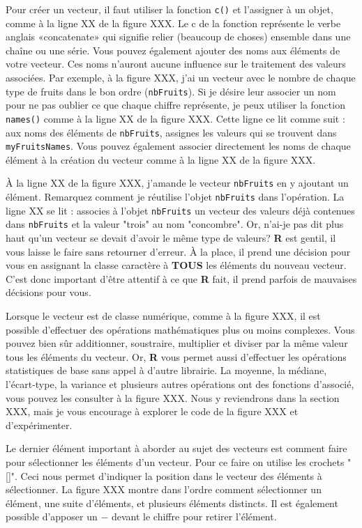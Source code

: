 \documentclass[10.5pt,a4paper]{article}
\begin{document}
    Pour créer un vecteur, il faut utiliser la fonction \texttt{c()} et l'assigner à un objet, comme à la ligne XX de la figure XXX. Le c de la fonction représente le verbe anglais «concatenate» qui signifie relier (beaucoup de choses) ensemble dans une chaîne ou une série. Vous pouvez également ajouter des noms aux éléments de votre vecteur. Ces noms n'auront aucune influence sur le traitement des valeurs associées. Par exemple, à la figure XXX, j'ai un vecteur avec le nombre de chaque type de fruits dans le bon ordre (\texttt{nbFruits}). Si je désire leur associer un nom pour ne pas oublier ce que chaque chiffre représente, je peux utiliser la fonction \texttt{names()} comme à la ligne XX de la figure XXX. Cette ligne ce lit comme suit : aux noms des éléments de \texttt{nbFruits}, assignes les valeurs qui se trouvent dans \texttt{myFruitsNames}. Vous pouvez également associer directement les noms de chaque élément à la création du vecteur comme à la ligne XX de la figure XXX. 
    
    À la ligne XX de la figure XXX, j'amande le vecteur \texttt{nbFruits} en y ajoutant un élément. Remarquez comment je réutilise l'objet \texttt{nbFruits} dans l'opération. La ligne XX se lit : associes à l'objet \texttt{nbFruits} un vecteur des valeurs déjà contenues dans \texttt{nbFruits} et la valeur "trois" au nom "concombre". Or, n'ai-je pas dit plus haut qu'un vecteur se devait d'avoir le même type de valeurs? \textbf{R} est gentil, il vous laisse le faire sans retourner d'erreur. À la place, il prend une décision pour vous en assignant la classe caractère à \textbf{TOUS} les éléments du nouveau vecteur. C'est donc important d'être attentif à ce que \textbf{R} fait, il prend parfois de mauvaises décisions pour vous. 
    
    Lorsque le vecteur est de classe numérique, comme à la figure XXX, il est possible d'effectuer des opérations mathématiques plus ou moins complexes. Vous pouvez bien sûr additionner, soustraire, multiplier et diviser par la même valeur tous les éléments du vecteur. Or, \textbf{R} vous permet aussi d'effectuer les opérations statistiques de base sans appel à d'autre librairie. La moyenne, la médiane, l'écart-type, la variance et plusieurs autres opérations ont des fonctions d'associé, vous pouvez les consulter à la figure XXX. Nous y reviendrons dans la section XXX, mais je vous encourage à explorer le code de la figure XXX et d'expérimenter. 
    
    Le dernier élément important à aborder au sujet des vecteurs est comment faire pour sélectionner les éléments d'un vecteur. Pour ce faire on utilise les crochets "[]". Ceci nous permet d'indiquer la position dans le vecteur des éléments à sélectionner. La figure XXX montre dans l'ordre comment sélectionner un élément, une suite d'éléments, et plusieurs éléments distincts. Il est également possible d'apposer un $-$ devant le chiffre pour retirer l'élément. 
    
\end{document}
